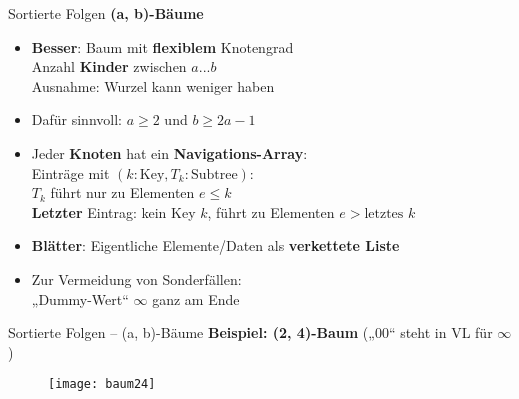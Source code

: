 \begin{frame}{Sortierte Folgen}
	\textbf{(a, b)-Bäume} 
	\begin{itemize}
		\item \textbf{Besser}: Baum mit \textbf{flexiblem} Knotengrad \\
		\impl Anzahl \textbf{Kinder} zwischen $a...b$ \\
		{\small Ausnahme: Wurzel kann weniger haben}
		\item Dafür sinnvoll: $a \geq 2$ und $b \geq 2a-1$
		\pause
		\item Jeder \textbf{Knoten} hat ein \textbf{Navigations-Array}: \\
		Einträge mit $(k: \text{Key}, T_k: \text{Subtree})$: \\
		\quad $T_k$ führt nur zu Elementen $e \leq k$ \\
		\quad \textbf{Letzter} Eintrag: kein Key $k$, führt zu Elementen $e > \text{letztes } k$
		\pause
		\item \textbf{Blätter}: Eigentliche Elemente/Daten als \textbf{verkettete Liste}
		\pause
		\item Zur Vermeidung von Sonderfällen: \\ 
		„Dummy-Wert“ $\infty$ ganz am Ende
	\end{itemize}
\end{frame}

\begin{frame}{Sortierte Folgen -- (a, b)-Bäume}
	\textbf{Beispiel: (2, 4)-Baum} („00“ steht in VL für $\infty$) \\[0,125cm]
	\begin{figure}[htp]
		\centering
		\texttt{[image: baum24]}
	\end{figure}
\end{frame}



